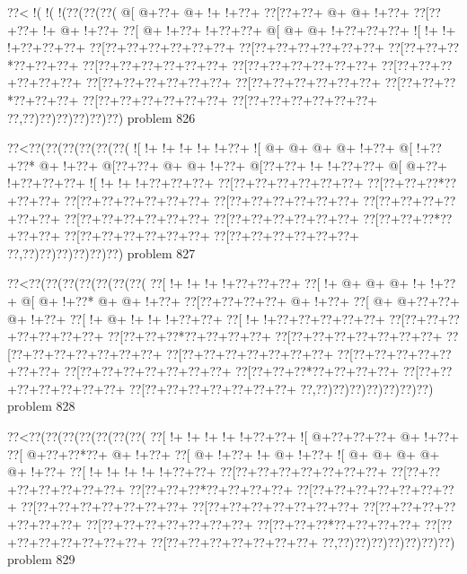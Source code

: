 \vbox{\vbox{\goo
\0??<\- !(\- !(\- !(\0??(\0??(\0??(
\- @[\- @+\0??+\- @+\- !+\- !+\0??+
\0??[\0??+\0??+\- @+\- @+\- !+\0??+
\0??[\0??+\0??+\- !+\- @+\- !+\0??+
\0??[\- @+\- !+\0??+\- !+\0??+\0??+
\- @[\- @+\- @+\- !+\0??+\0??+\0??+
\- ![\- !+\- !+\- !+\0??+\0??+\0??+
\0??[\0??+\0??+\0??+\0??+\0??+\0??+
\0??[\0??+\0??+\0??+\0??+\0??+\0??+
\0??[\0??+\0??+\0??*\0??+\0??+\0??+
\0??[\0??+\0??+\0??+\0??+\0??+\0??+
\0??[\0??+\0??+\0??+\0??+\0??+\0??+
\0??[\0??+\0??+\0??+\0??+\0??+\0??+
\0??[\0??+\0??+\0??+\0??+\0??+\0??+
\0??[\0??+\0??+\0??+\0??+\0??+\0??+
\0??[\0??+\0??+\0??*\0??+\0??+\0??+
\0??[\0??+\0??+\0??+\0??+\0??+\0??+
\0??[\0??+\0??+\0??+\0??+\0??+\0??+
\0??,\0??)\0??)\0??)\0??)\0??)\0??)
}
\hfil problem 826\hfil\break
}

\vbox{\vbox{\goo
\0??<\0??(\0??(\0??(\0??(\0??(\0??(
\- ![\- !+\- !+\- !+\- !+\- !+\0??+
\- ![\- @+\- @+\- @+\- @+\- !+\0??+
\- @[\- !+\0??+\0??*\- @+\- !+\0??+
\- @[\0??+\0??+\- @+\- @+\- !+\0??+
\- @[\0??+\0??+\- !+\- !+\0??+\0??+
\- @[\- @+\0??+\- !+\0??+\0??+\0??+
\- ![\- !+\- !+\- !+\0??+\0??+\0??+
\0??[\0??+\0??+\0??+\0??+\0??+\0??+
\0??[\0??+\0??+\0??*\0??+\0??+\0??+
\0??[\0??+\0??+\0??+\0??+\0??+\0??+
\0??[\0??+\0??+\0??+\0??+\0??+\0??+
\0??[\0??+\0??+\0??+\0??+\0??+\0??+
\0??[\0??+\0??+\0??+\0??+\0??+\0??+
\0??[\0??+\0??+\0??+\0??+\0??+\0??+
\0??[\0??+\0??+\0??*\0??+\0??+\0??+
\0??[\0??+\0??+\0??+\0??+\0??+\0??+
\0??[\0??+\0??+\0??+\0??+\0??+\0??+
\0??,\0??)\0??)\0??)\0??)\0??)\0??)
}
\hfil problem 827\hfil\break
}

\vbox{\vbox{\goo
\0??<\0??(\0??(\0??(\0??(\0??(\0??(\0??(
\0??[\- !+\- !+\- !+\- !+\0??+\0??+\0??+
\0??[\- !+\- @+\- @+\- @+\- !+\- !+\0??+
\- @[\- @+\- !+\0??*\- @+\- @+\- !+\0??+
\0??[\0??+\0??+\0??+\0??+\- @+\- !+\0??+
\0??[\- @+\- @+\0??+\0??+\- @+\- !+\0??+
\0??[\- !+\- @+\- !+\- !+\- !+\0??+\0??+
\0??[\- !+\- !+\0??+\0??+\0??+\0??+\0??+
\0??[\0??+\0??+\0??+\0??+\0??+\0??+\0??+
\0??[\0??+\0??+\0??*\0??+\0??+\0??+\0??+
\0??[\0??+\0??+\0??+\0??+\0??+\0??+\0??+
\0??[\0??+\0??+\0??+\0??+\0??+\0??+\0??+
\0??[\0??+\0??+\0??+\0??+\0??+\0??+\0??+
\0??[\0??+\0??+\0??+\0??+\0??+\0??+\0??+
\0??[\0??+\0??+\0??+\0??+\0??+\0??+\0??+
\0??[\0??+\0??+\0??*\0??+\0??+\0??+\0??+
\0??[\0??+\0??+\0??+\0??+\0??+\0??+\0??+
\0??[\0??+\0??+\0??+\0??+\0??+\0??+\0??+
\0??,\0??)\0??)\0??)\0??)\0??)\0??)\0??)
}
\hfil problem 828\hfil\break
}

\vbox{\vbox{\goo
\0??<\0??(\0??(\0??(\0??(\0??(\0??(\0??(
\0??[\- !+\- !+\- !+\- !+\- !+\0??+\0??+
\- ![\- @+\0??+\0??+\0??+\- @+\- !+\0??+
\0??[\- @+\0??+\0??*\0??+\- @+\- !+\0??+
\0??[\- @+\- !+\0??+\- !+\- @+\- !+\0??+
\- ![\- @+\- @+\- @+\- @+\- @+\- !+\0??+
\0??[\- !+\- !+\- !+\- !+\- !+\0??+\0??+
\0??[\0??+\0??+\0??+\0??+\0??+\0??+\0??+
\0??[\0??+\0??+\0??+\0??+\0??+\0??+\0??+
\0??[\0??+\0??+\0??*\0??+\0??+\0??+\0??+
\0??[\0??+\0??+\0??+\0??+\0??+\0??+\0??+
\0??[\0??+\0??+\0??+\0??+\0??+\0??+\0??+
\0??[\0??+\0??+\0??+\0??+\0??+\0??+\0??+
\0??[\0??+\0??+\0??+\0??+\0??+\0??+\0??+
\0??[\0??+\0??+\0??+\0??+\0??+\0??+\0??+
\0??[\0??+\0??+\0??*\0??+\0??+\0??+\0??+
\0??[\0??+\0??+\0??+\0??+\0??+\0??+\0??+
\0??[\0??+\0??+\0??+\0??+\0??+\0??+\0??+
\0??,\0??)\0??)\0??)\0??)\0??)\0??)\0??)
}
\hfil problem 829\hfil\break
}

